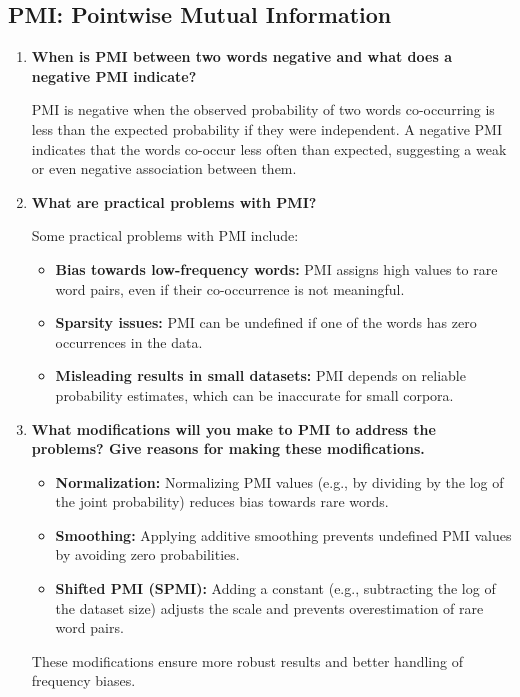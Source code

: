 \documentclass{article}
\begin{document}
	\subsection { PMI: Pointwise Mutual Information }
\begin{enumerate}
    \item \textbf{When is PMI between two words negative and what does a negative PMI indicate?}
    
    PMI is negative when the observed probability of two words co-occurring is less than the expected probability if they were independent. A negative PMI indicates that the words co-occur less often than expected, suggesting a weak or even negative association between them.

    \item \textbf{What are practical problems with PMI?}

    Some practical problems with PMI include:
    \begin{itemize}
        \item \textbf{Bias towards low-frequency words:} PMI assigns high values to rare word pairs, even if their co-occurrence is not meaningful.
        \item \textbf{Sparsity issues:} PMI can be undefined if one of the words has zero occurrences in the data.
        \item \textbf{Misleading results in small datasets:} PMI depends on reliable probability estimates, which can be inaccurate for small corpora.
    \end{itemize}

    \item \textbf{What modifications will you make to PMI to address the problems? Give reasons for making these modifications.}
    \begin{itemize}
        \item \textbf{Normalization:} Normalizing PMI values (e.g., by dividing by the log of the joint probability) reduces bias towards rare words.
        \item \textbf{Smoothing:} Applying additive smoothing prevents undefined PMI values by avoiding zero probabilities.
        \item \textbf{Shifted PMI (SPMI):} Adding a constant (e.g., subtracting the log of the dataset size) adjusts the scale and prevents overestimation of rare word pairs.
    \end{itemize}

    These modifications ensure more robust results and better handling of frequency biases.


\end{enumerate}
\end{document}
